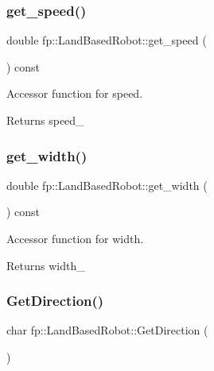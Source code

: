 \subsubsection{\texorpdfstring{get\+\_\+speed()}{get\_speed()}}
{\footnotesize\ttfamily double fp\+::\+Land\+Based\+Robot\+::get\+\_\+speed (\begin{DoxyParamCaption}{ }\end{DoxyParamCaption}) const\hspace{0.3cm}{\ttfamily [inline]}}



Accessor function for speed. 

\begin{DoxyReturn}{Returns}
speed\+\_\+ 
\end{DoxyReturn}
\mbox{\label{classfp_1_1_land_based_robot_a523b439167030a7ab1e0e7f6c8d42315}} 
\subsubsection{\texorpdfstring{get\+\_\+width()}{get\_width()}}
{\footnotesize\ttfamily double fp\+::\+Land\+Based\+Robot\+::get\+\_\+width (\begin{DoxyParamCaption}{ }\end{DoxyParamCaption}) const\hspace{0.3cm}{\ttfamily [inline]}}



Accessor function for width. 

\begin{DoxyReturn}{Returns}
width\+\_\+ 
\end{DoxyReturn}
\mbox{\label{classfp_1_1_land_based_robot_a50841b6e40d4e92832770d26b427fea2}} 
\subsubsection{\texorpdfstring{Get\+Direction()}{GetDirection()}}
{\footnotesize\ttfamily char fp\+::\+Land\+Based\+Robot\+::\+Get\+Direction (\begin{DoxyParamCaption}{ }\end{DoxyParamCaption})\hspace{0.3cm}{\ttfamily [pure virtual]}}

